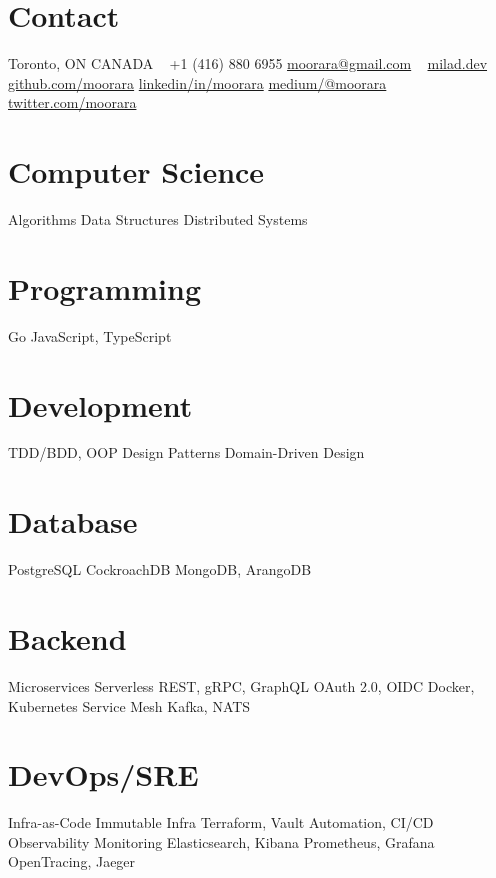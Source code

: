 \documentclass[]{cv-style}                     %
\begin{document}
\lastupdated



\begin{aside}
%
\section{Contact}
Toronto, ON  CANADA
~
+1 (416) 880 6955
\href{mailto:moorara@gmail.com}{moorara@gmail.com}
~
\href{https://milad.dev}{milad.dev}
\href{https://github.com/moorara}{github.com/moorara}
\href{https://linkedin.com/in/moorara}{linkedin/in/moorara}
\href{https://medium.com/@moorara}{medium/@moorara}
\href{http://twitter.com/moorara}{twitter.com/moorara}
%
\section{Computer Science}
Algorithms
Data Structures
Distributed Systems
%
\section{Programming}
Go
JavaScript, TypeScript
%
\section{Development}
TDD/BDD, OOP
Design Patterns
Domain-Driven Design
%
\section{Database}
PostgreSQL
CockroachDB
MongoDB, ArangoDB
%
\section{Backend}
Microservices
Serverless
REST, gRPC, GraphQL
OAuth 2.0, OIDC
Docker, Kubernetes
Service Mesh
Kafka, NATS
%
%
\section{DevOps/SRE}
Infra-as-Code
Immutable Infra
Terraform, Vault
Automation, CI/CD
Observability
Monitoring
Elasticsearch, Kibana
Prometheus, Grafana
OpenTracing, Jaeger
%

\end{aside}
\end{document}
